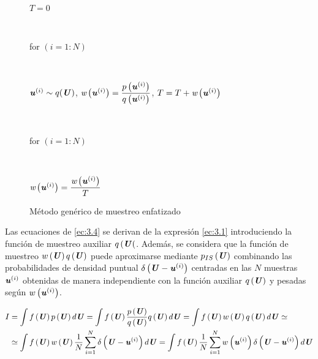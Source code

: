 \begin{figure}[ht]
    \centering
    \begin{tcolorbox}[colframe=black, colback=white, boxrule=0.5pt, width=0.7\textwidth, sharp corners]
        \parbox[t]{\linewidth}{$T = 0$} \\[0.5em]
        \parbox[t]{\linewidth}{for $(i=1:N)$} \\[0.5em]
        \parbox[t]{\linewidth}{\hspace{1em} $\textbf{\textit{u}}^{(i)} \sim q(\textbf{\textit{U}})$, \quad $\textit{w}\left(\textbf{\textit{u}}^{(i)}\right)=\dfrac{p\left(\textbf{\textit{u}}^{(i)}\right)}{q\left(\textbf{\textit{u}}^{(i)}\right)}$, \quad $T = T + \textit{w}\left(\textbf{\textit{u}}^{(i)}\right)$} \\[0.5em]
        \parbox[t]{\linewidth}{for $(i=1:N)$} \\[0.5em]
        \parbox[t]{\linewidth}{\hspace{1em} $\textit{w}\left(\textbf{\textit{u}}^{(i)}\right) = \dfrac{\textit{w}\left(\textbf{\textit{u}}^{(i)}\right)}{T}$}
    \end{tcolorbox}
    \caption{Método genérico de muestreo enfatizado}
    \label{fig:3.2}
\end{figure}

Las ecuaciones de \ref{ec:3.4} se derivan de la expresión \ref{ec:3.1} introduciendo la función de muestreo auxiliar $q\left(\textbf{\textit{U}}\right($. Además, se considera que la función de muestreo $w\left(\textbf{\textit{U}}\right)q\left(\textbf{\textit{U}}\right)$ puede aproximarse mediante $p_{IS}\left(\textbf{\textit{U}}\right)$ combinando las probabilidades de densidad puntual $\delta\left(\textbf{\textit{U}}-\textbf{\textit{u}}^{(i)}\right)$ centradas en las $N$ muestras $\textbf{\textit{u}}^{(i)}$ obtenidas de manera independiente con la función auxiliar $q\left(\textbf{\textit{U}}\right)$ y pesadas según $w\left(\textbf{\textit{u}}^{(i)}\right)$.

\begin{equation*}
    \begin{aligned}
        I &= \int f\left(\textbf{\textit{U}}\right)p\left(\textbf{\textit{U}}\right)d\textbf{\textit{U}} = \int f\left(\textbf{\textit{U}}\right)\dfrac{p\left(\textbf{\textit{U}}\right)}{q\left(\textbf{\textit{U}}\right)}q\left(\textbf{\textit{U}}\right)d\textbf{\textit{U}} = \int f\left(\textbf{\textit{U}}\right)w\left(\textbf{\textit{U}}\right)q\left(\textbf{\textit{U}}\right)d\textbf{\textit{U}} \simeq  \\
        &\simeq \int f\left(\textbf{\textit{U}}\right)w\left(\textbf{\textit{U}}\right)\dfrac{1}{N}\sum_{i=1}^{N}\delta\left(\textbf{\textit{U}}-\textbf{\textit{u}}^{(i)}\right)d\textbf{\textit{U}} = \int f\left(\textbf{\textit{U}}\right)\dfrac{1}{N}\sum_{i=1}^{N}w\left(\textbf{\textit{u}}^{(i)}\right)\delta\left(\textbf{\textit{U}}-\textbf{\textit{u}}^{(i)}\right)d\textbf{\textit{U}}
    \end{aligned}
\end{equation*}

